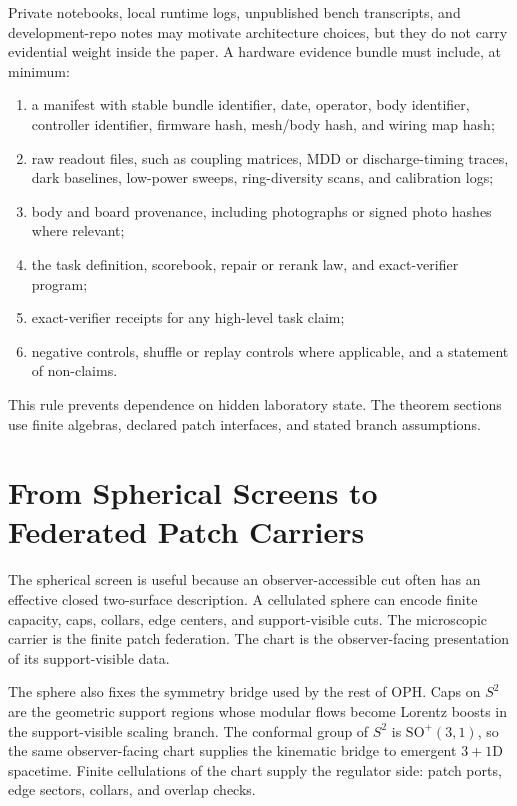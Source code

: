\documentclass[11pt]{article}
\theoremstyle{remark}
\theoremstyle{plain}
\begin{document}
Private notebooks, local runtime logs, unpublished bench transcripts, and development-repo notes
may motivate architecture choices, but they do not carry evidential weight inside the paper. A
hardware evidence bundle must include, at minimum:
\begin{enumerate}[leftmargin=2em]
\item a manifest with stable bundle identifier, date, operator, body identifier, controller
identifier, firmware hash, mesh/body hash, and wiring map hash;
\item raw readout files, such as coupling matrices, MDD or discharge-timing traces, dark
baselines, low-power sweeps, ring-diversity scans, and calibration logs;
\item body and board provenance, including photographs or signed photo hashes where relevant;
\item the task definition, scorebook, repair or rerank law, and exact-verifier program;
\item exact-verifier receipts for any high-level task claim;
\item negative controls, shuffle or replay controls where applicable, and a statement of
non-claims.
\end{enumerate}

This rule prevents dependence on hidden laboratory state. The theorem sections use finite
algebras, declared patch interfaces, and stated branch assumptions.

\section{From Spherical Screens to Federated Patch Carriers}

The spherical screen is useful because an observer-accessible cut often has an effective closed
two-surface description. A cellulated sphere can encode finite capacity, caps, collars, edge
centers, and support-visible cuts. The microscopic carrier is the finite patch federation. The
chart is the observer-facing presentation of its support-visible data.

The sphere also fixes the symmetry bridge used by the rest of OPH. Caps on \(S^2\) are the
geometric support regions whose modular flows become Lorentz boosts in the support-visible
scaling branch. The conformal group of \(S^2\) is \(\mathrm{SO}^+(3,1)\), so the same
observer-facing chart supplies the kinematic bridge to emergent \(3+1\)D spacetime. Finite
cellulations of the chart supply the regulator side: patch ports, edge sectors, collars, and
overlap checks.
\end{document}
